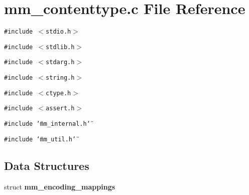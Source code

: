 \section{mm\_\-contenttype.c File Reference}
\label{mm__contenttype_8c}
{\tt \#include $<$stdio.h$>$}\par
{\tt \#include $<$stdlib.h$>$}\par
{\tt \#include $<$stdarg.h$>$}\par
{\tt \#include $<$string.h$>$}\par
{\tt \#include $<$ctype.h$>$}\par
{\tt \#include $<$assert.h$>$}\par
{\tt \#include \char`\"{}mm\_\-internal.h\char`\"{}}\par
{\tt \#include \char`\"{}mm\_\-util.h\char`\"{}}\par
\subsection*{Data Structures}
\begin{CompactItemize}
\item 
struct \textbf{mm\_\-encoding\_\-mappings}
\end{CompactItemize}
